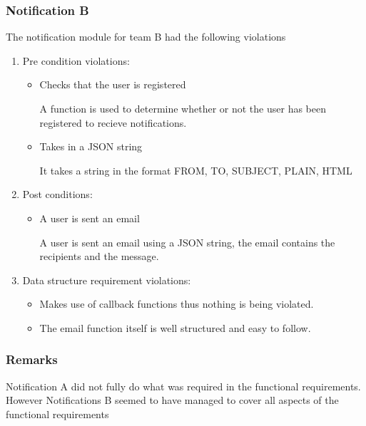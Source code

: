  \subsubsection*{Notification B}
 The notification module for team B had the following violations
 \begin{enumerate}
 	\item Pre condition violations:
 	\begin{itemize}
 		
			\item Checks that the user is registered 
			
			A function is used to determine whether or not the user has been registered to recieve notifications.
			
			\item Takes in a JSON string
				
			It takes a string in the format FROM, TO, SUBJECT, PLAIN, HTML
 		
 		 
 	\end{itemize}
	\item Post conditions:
	\begin{itemize}
			\item A user is sent an email
			
			A user is sent an email using a JSON string, the email contains the recipients and the message.
 	
	\end{itemize}
	\item Data structure requirement violations:
 	\begin{itemize}
 		\item 	Makes use of callback functions thus nothing is being violated.
		\item	The email function itself is well structured and easy to follow.
 	\end{itemize}
 \end{enumerate}
 \subsubsection*{Remarks}
 Notification A did not fully do what was required in the functional requirements. However Notifications B seemed to have managed to cover all aspects of the functional requirements